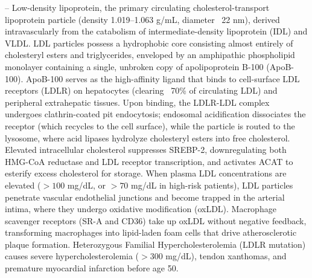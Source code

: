 -- Low-density lipoprotein, the primary circulating cholesterol-transport lipoprotein particle (density 1.019--1.063 g/mL, diameter ~22 nm), derived intravascularly from the catabolism of intermediate-density lipoprotein (IDL) and VLDL. LDL particles possess a hydrophobic core consisting almost entirely of cholesteryl esters and triglycerides, enveloped by an amphipathic phospholipid monolayer containing a single, unbroken copy of apolipoprotein B-100 (ApoB-100). ApoB-100 serves as the high-affinity ligand that binds to cell-surface LDL receptors (LDLR) on hepatocytes (clearing ~70\% of circulating LDL) and peripheral extrahepatic tissues. Upon binding, the LDLR-LDL complex undergoes clathrin-coated pit endocytosis; endosomal acidification dissociates the receptor (which recycles to the cell surface), while the particle is routed to the lysosome, where acid lipases hydrolyze cholesteryl esters into free cholesterol. Elevated intracellular cholesterol suppresses SREBP-2, downregulating both HMG-CoA reductase and LDL receptor transcription, and activates ACAT to esterify excess cholesterol for storage. When plasma LDL concentrations are elevated ($>100$ mg/dL, or $>70$ mg/dL in high-risk patients), LDL particles penetrate vascular endothelial junctions and become trapped in the arterial intima, where they undergo oxidative modification (oxLDL). Macrophage scavenger receptors (SR-A and CD36) take up oxLDL without negative feedback, transforming macrophages into lipid-laden foam cells that drive atherosclerotic plaque formation. Heterozygous Familial Hypercholesterolemia (LDLR mutation) causes severe hypercholesterolemia ($>300$ mg/dL), tendon xanthomas, and premature myocardial infarction before age 50.

